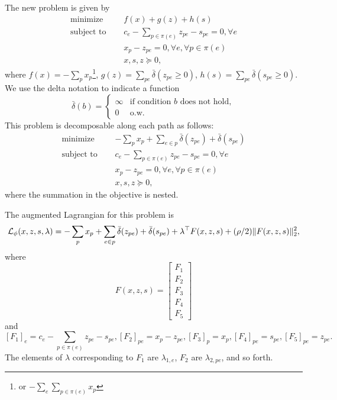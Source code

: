 \documentclass[11pt]{article}
\begin{document}
The new problem is given by
\begin{equation}
\label{eqn:network-opt-std}
\begin{aligned}
\textrm{minimize } \quad & f(x) + g(z) + h(s)\\
\textrm{subject to } \quad &c_e - \sum_{p\in\pi(e)}z_{pe} - s_{pe} = 0, \forall e\\
&x_p - z_{pe} = 0, \forall e, \forall p \in \pi(e)\\
&x,s,z \succeq 0,
\end{aligned}
\end{equation}
where $f(x) = -\sum_p x_p$\footnote{
or $-\sum_e \sum_{p\in\pi(e)}x_p$},
$g(z) = \sum_{pe} \bar\delta(z_{pe} \ge 0)$, $h(s) = \sum_{pe} \bar\delta(s_{pe} \ge 0)$.
We use the delta notation to indicate a function
$$
\bar\delta(b) = \begin{cases}
    \infty & \textrm{if condition } b \textrm{ does not hold},\\
    0 & \textrm{o.w.}
\end{cases}
$$
This problem is decomposable along each path as follows:
\begin{equation}
\label{eqn:network-opt-sep}
\begin{aligned}
\textrm{minimize } \quad & -\sum_p x_p + \sum_{e \in p} \bar\delta(z_{pe}) + \bar\delta(s_{pe})\\
\textrm{subject to } \quad &c_e - \sum_{p\in\pi(e)}z_{pe} - s_{pe} = 0, \forall e\\
&x_p - z_{pe} = 0, \forall e, \forall p \in \pi(e)\\
&x,s,z \succeq 0,
\end{aligned}
\end{equation}
where the summation in the objective is nested.

The augmented Lagrangian for this problem is
\begin{equation}
    \label{eqn:network-lagrangian}
    \mathcal{L}_\phi(x,z,s,\lambda) =-\sum_p x_p + \sum_{e \in p} \bar\delta(z_{pe}) + \bar\delta(s_{pe})
        + \lambda^\top F(x,z,s)
    + (\rho/2)\| F(x,z,s) \|_2^2,
\end{equation}
where
$$F(x,z,s) =
\begin{bmatrix}
F_1 \\
F_2 \\
F_3 \\
F_4 \\
F_5
\end{bmatrix}
$$
and
$$
    [F_1]_e = c_e - \sum_{p\in\pi(e)}z_{pe} - s_{pe},
    [F_2]_{pe} = x_p - z_{pe},
    [F_3]_p = x_p,
    [F_4]_{pe} = s_{pe},
    [F_5]_{pe} = z_{pe}.
$$
The elements of $\lambda$ corresponding to $F_1$ are $\lambda_{1,e}$,
$F_2$ are $\lambda_{2,pe}$, and so forth.
\end{document}
